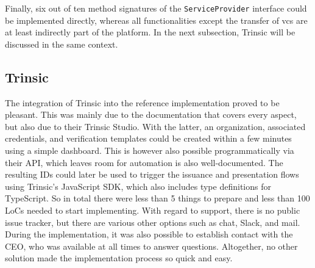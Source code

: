         Finally, six out of ten method signatures of the \texttt{ServiceProvider} interface could be implemented directly, whereas all functionalities except the transfer of \acp{vc} are at least indirectly part of the platform. In the next subsection, Trinsic will be discussed in the same context.
    
        \subsection{Trinsic}\label{subsection: trinsic}
        
            The integration of Trinsic into the reference implementation proved to be pleasant. This was mainly due to the documentation that covers every aspect, but also due to their Trinsic Studio. With the latter, an organization, associated credentials, and verification templates could be created within a few minutes using a simple dashboard. This is however also possible programmatically via their API, which leaves room for automation is also well-documented. The resulting IDs could later be used to trigger the issuance and presentation flows using Trinsic's JavaScript SDK, which also includes type definitions for TypeScript. So in total there were less than 5 things to prepare and less than 100 LoCs needed to start implementing. With regard to support, there is no public issue tracker, but there are various other options such as chat, Slack, and mail. During the implementation, it was also possible to establish contact with the CEO, who was available at all times to answer questions. Altogether, no other solution made the implementation process so quick and easy.
    
